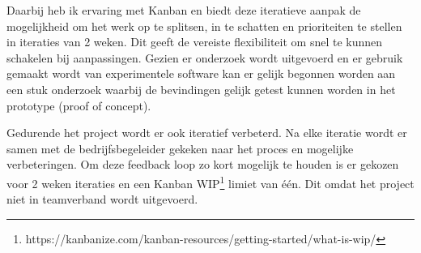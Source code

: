 Daarbij heb ik ervaring met Kanban en biedt deze iteratieve aanpak de mogelijkheid om het werk op te splitsen, in te schatten en prioriteiten te stellen in iteraties van 2 weken. Dit geeft de vereiste flexibiliteit om snel te kunnen schakelen bij aanpassingen. Gezien er onderzoek wordt uitgevoerd en er gebruik gemaakt wordt van experimentele software kan er gelijk begonnen worden aan een stuk onderzoek waarbij de bevindingen gelijk getest kunnen worden in het prototype (proof of concept).\par

Gedurende het project wordt er ook iteratief verbeterd. Na elke iteratie wordt er samen met de bedrijfsbegeleider gekeken naar het proces en mogelijke verbeteringen. Om deze feedback loop zo kort mogelijk te houden is er gekozen voor 2 weken iteraties en een Kanban WIP\footnote{https://kanbanize.com/kanban-resources/getting-started/what-is-wip/} limiet van één. Dit omdat het project niet in teamverband wordt uitgevoerd.